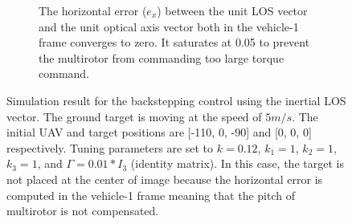 \begin{figure}[htbp]
\begin{subfigure}[t]{0.8\linewidth}
		\caption{The horizontal error ($e_x$) between the unit LOS vector and the unit optical axis vector both in the vehicle-1 frame converges to zero. It saturates at 0.05 to prevent the multirotor from commanding too large torque command.}
	\end{subfigure}	
	\caption{Simulation result for the backstepping control using the inertial LOS vector. The ground target is moving at the speed of $5m/s$. The initial UAV and target positions are [-110, 0, -90] and [0, 0, 0] respectively. Tuning parameters are set to $k=0.12$, $k_1=1$, $k_2=1$, $k_3=1$, and $\Gamma=0.01*I_3$ (identity matrix). In this case, the target is not placed at the center of image because the horizontal error is computed in the vehicle-1 frame meaning that the pitch of multirotor is not compensated.}
	\label{inertial_5mps}
\end{figure}

